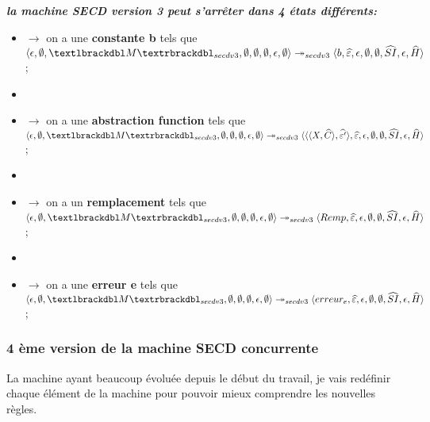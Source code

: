 \documentclass[10pt,a4paper]{article}
\begin{document}
				\textbf{\textit{la machine SECD version 3 peut s'arrêter dans 4 états différents:}}
				\smallbreak
				\begin{itemize}
					\item[]$\longrightarrow$ on a une \textbf{constante b} tels que $\langle \epsilon,\emptyset,\textlbrackdbl M\textrbrackdbl_{secdv3},\emptyset,\emptyset,\emptyset,\epsilon,\emptyset\rangle \twoheadrightarrow_{secdv3} \langle b,\widehat{\varepsilon},\epsilon,\emptyset,\emptyset,\widehat{SI},\epsilon,\widehat{H}\rangle$;
					\item[]
					\item[]$\longrightarrow$ on a une \textbf{abstraction function} tels que $\langle \epsilon,\emptyset,\textlbrackdbl M\textrbrackdbl_{secdv3},\emptyset,\emptyset,\emptyset,\epsilon,\emptyset\rangle \twoheadrightarrow_{secdv3} \langle\langle\langle X,\widehat{C}\rangle,\widehat{\varepsilon'}\rangle,\widehat{\varepsilon},\epsilon,\emptyset,\emptyset,\widehat{SI},\epsilon,\widehat{H}\rangle$;
					\item[]
					\item[]$\longrightarrow$ on a un \textbf{remplacement} tels que $\langle \epsilon,\emptyset,\textlbrackdbl M\textrbrackdbl_{secdv3},\emptyset,\emptyset,\emptyset,\epsilon,\emptyset\rangle \twoheadrightarrow_{secdv3} \langle Remp,\widehat{\varepsilon},\epsilon,\emptyset,\emptyset,\widehat{SI},\epsilon,\widehat{H}\rangle$;
					\item[]
					\item[]$\longrightarrow$ on a une \textbf{erreur e} tels que $\langle \epsilon,\emptyset,\textlbrackdbl M\textrbrackdbl_{secdv3},\emptyset,\emptyset,\emptyset,\epsilon,\emptyset\rangle \twoheadrightarrow_{secdv3} \langle erreur_{e},\widehat{\varepsilon},\epsilon,\emptyset,\emptyset,\widehat{SI},\epsilon,\widehat{H}\rangle$;
				\end{itemize}
			\subsubsection{4 ème version de la machine SECD concurrente}
				La machine ayant beaucoup évoluée depuis le début du travail, je vais redéfinir chaque élément de la machine pour pouvoir mieux comprendre les nouvelles règles.
			\bigbreak
			
\end{document}
